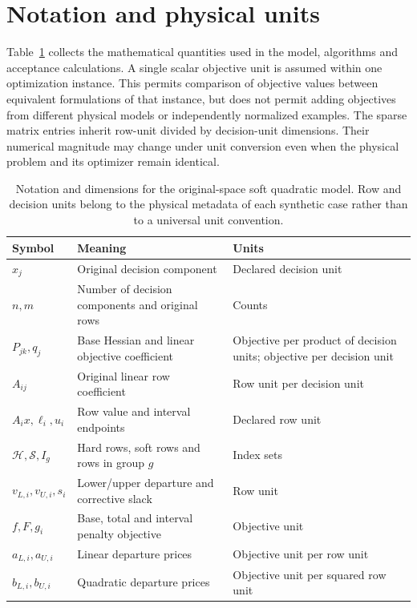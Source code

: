 \section{Notation and physical units}\label{sec:notation}
Table~\ref{tab:notation} collects the mathematical quantities used in the model,
algorithms and acceptance calculations. A single scalar objective unit is assumed
within one optimization instance. This permits comparison of objective values
between equivalent formulations of that instance, but does not permit adding
objectives from different physical models or independently normalized examples.
The sparse matrix entries inherit row-unit divided by decision-unit dimensions.
Their numerical magnitude may change under unit conversion even when the physical
problem and its optimizer remain identical.

\begin{table}[htbp]\centering\small
\caption{Notation and dimensions for the original-space soft quadratic model. Row and decision units belong to the physical metadata of each synthetic case rather than to a universal unit convention.}\label{tab:notation}
\begin{tabularx}{\textwidth}{@{}l>{\raggedright\arraybackslash}X>{\raggedright\arraybackslash}X@{}}\toprule
Symbol & Meaning & Units\\\midrule
$x_j$ & Original decision component & Declared decision unit\\
$n,m$ & Number of decision components and original rows & Counts\\
$P_{jk},q_j$ & Base Hessian and linear objective coefficient & Objective per product of decision units; objective per decision unit\\
$A_{ij}$ & Original linear row coefficient & Row unit per decision unit\\
$A_i x,\ell_i,u_i$ & Row value and interval endpoints & Declared row unit\\
$\mathcal H,\mathcal S,I_g$ & Hard rows, soft rows and rows in group $g$ & Index sets\\
$v_{L,i},v_{U,i},s_i$ & Lower/upper departure and corrective slack & Row unit\\
$f,F,g_i$ & Base, total and interval penalty objective & Objective unit\\
$a_{L,i},a_{U,i}$ & Linear departure prices & Objective unit per row unit\\
$b_{L,i},b_{U,i}$ & Quadratic departure prices & Objective unit per squared row unit\\

\end{tabularx}
\end{table}
